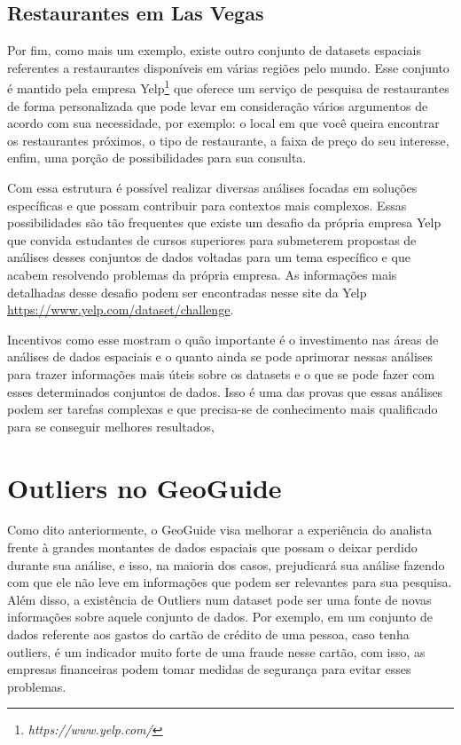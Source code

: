 \subsection{Restaurantes em Las Vegas}

Por fim, como mais um exemplo, existe outro conjunto de datasets espaciais referentes a restaurantes disponíveis em várias regiões pelo mundo. Esse conjunto é mantido pela empresa Yelp\footnote{\it https://www.yelp.com/} que oferece um serviço de pesquisa de restaurantes de forma personalizada que pode levar em consideração vários argumentos de acordo com sua necessidade, por exemplo: o local em que você queira encontrar os restaurantes próximos, o tipo de restaurante, a faixa de preço do seu interesse, enfim, uma porção de possibilidades para sua consulta.

Com essa estrutura é possível realizar diversas análises focadas em soluções específicas e que possam contribuir para contextos mais complexos. Essas possibilidades são tão frequentes que existe um desafio da própria empresa Yelp que convida estudantes de cursos superiores para submeterem propostas de análises desses conjuntos de dados voltadas para um tema específico e que acabem resolvendo problemas da própria empresa. As informações mais detalhadas desse desafio podem ser encontradas nesse site da Yelp \url{https://www.yelp.com/dataset/challenge}.

Incentivos como esse mostram o quão importante é o investimento nas áreas de análises de dados espaciais e o quanto ainda se pode aprimorar nessas análises para trazer informações mais úteis sobre os datasets e o que se pode fazer com esses determinados conjuntos de dados. Isso é uma das provas que essas análises podem ser tarefas complexas e que precisa-se de conhecimento mais qualificado para se conseguir melhores resultados,

\section{Outliers no GeoGuide}

Como dito anteriormente, o GeoGuide visa melhorar a experiência do analista frente à grandes montantes de dados espaciais que possam o deixar perdido durante sua análise, e isso, na maioria dos casos, prejudicará sua análise fazendo com que ele não leve em informações que podem ser relevantes para sua pesquisa. Além disso, a existência de Outliers num dataset pode ser uma fonte de novas informações sobre aquele conjunto de dados. Por exemplo, em um conjunto de dados referente aos gastos do cartão de crédito de uma pessoa, caso tenha outliers, é um indicador muito forte de uma fraude nesse cartão, com isso, as empresas financeiras podem tomar medidas de segurança para evitar esses problemas.

